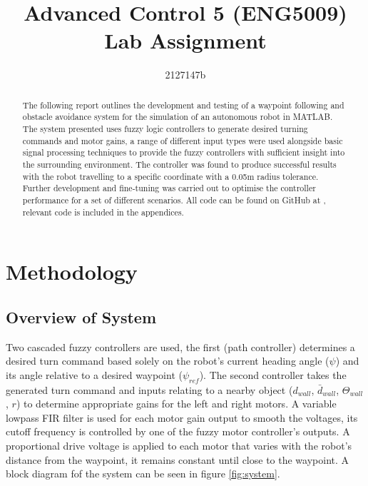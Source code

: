 \documentclass[10pt]{article}
\begin{document}
\title{Advanced Control 5 (ENG5009) \\ \large{Lab Assignment}}
\author{2127147b}
\maketitle

\begin{abstract}
    The following report outlines the development and testing of a waypoint following and obstacle avoidance system for the simulation of an autonomous robot in MATLAB.
    The system presented uses fuzzy logic controllers to generate desired turning commands and motor gains, a range of different input types were used alongside basic signal processing techniques to provide the fuzzy controllers with sufficient insight into the surrounding environment.
    The controller was found to produce successful results with the robot travelling to a specific coordinate with a 0.05m radius tolerance. 
    Further development and fine-tuning was carried out to optimise the controller performance for a set of different scenarios.
    All code can be found on GitHub at \cite{github}, relevant code is included in the appendices.  
    \end{abstract}

\section{Methodology}
\subsection{Overview of System}
Two cascaded fuzzy controllers are used, the first (path controller) determines a desired turn command based solely on the robot's current heading angle ($\psi$) and its angle relative to a desired waypoint ($\psi_{ref}$).
The second controller takes the generated turn command and inputs relating to a nearby object ($d_{wall}$, $\bar{d}_{wall}$, $\Theta_{wall}$, $r$) to determine appropriate gains for the left and right motors.
A variable lowpass FIR filter is used for each motor gain output to smooth the voltages, its cutoff frequency is controlled by one of the fuzzy motor controller's outputs.
A proportional drive voltage is applied to each motor that varies with the robot's distance from the waypoint, it remains constant until close to the waypoint. 
A block diagram fof the system can be seen in figure \ref{fig:system}.
\end{document}
